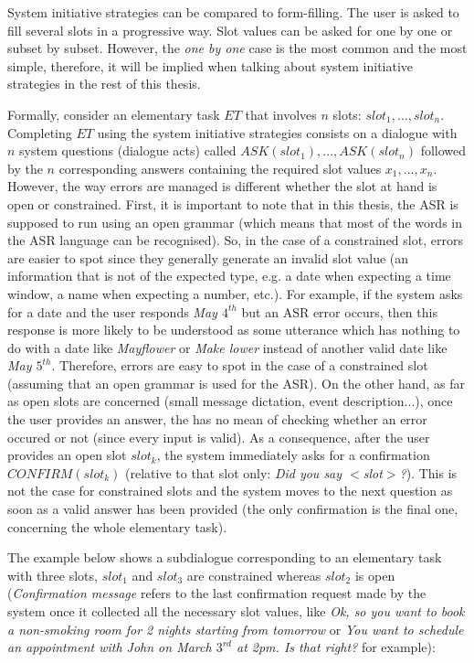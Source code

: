 		System initiative strategies can be compared to form-filling. The user is asked to fill several slots in a progressive way. Slot values can be asked for one by one or subset by subset. However, the \textit{one by one} case is the most common and the most simple, therefore, it will be implied when talking about system initiative strategies in the rest of this thesis.
		
		Formally, consider an elementary task $ET$ that involves $n$ slots: $slot_1, ..., slot_n$. Completing $ET$ using the system initiative strategies consists on a dialogue with $n$ system questions (dialogue acts) called $ASK(slot_1),...,ASK(slot_n)$ followed by the $n$ corresponding answers containing the required slot values $x_1,...,x_n$. However, the way errors are managed is different whether the slot at hand is open or constrained. First, it is important to note that in this thesis, the ASR is supposed to run using an open grammar (which means that most of the words in the ASR language can be recognised). So, in the case of a constrained slot, errors are easier to spot since they generally generate an invalid slot value (an information that is not of the expected type, e.g. a date when expecting a time window, a name when expecting a number, etc.). For example, if the system asks for a date and the user responds \textit{May $4^{th}$} but an ASR error occurs, then this response is more likely to be understood as some utterance which has nothing to do with a date like \textit{Mayflower} or \textit{Make lower} instead of another valid date like \textit{May $5^{th}$}. Therefore, errors are easy to spot in the case of a constrained slot (assuming that an open grammar is used for the ASR). On the other hand, as far as open slots are concerned (small message dictation, event description...), once the user provides an answer, the has no mean of checking whether an error occured or not (since every input is valid). As a consequence, after the user provides an open slot $slot_k$, the system immediately asks for a confirmation $CONFIRM(slot_k)$ (relative to that slot only: \textit{Did you say $<$slot$>$?}). This is not the case for constrained slots and the system moves to the next question as soon as a valid answer has been provided (the only confirmation is the final one, concerning the whole elementary task).

                The example below shows a subdialogue corresponding to an elementary task with three slots, $slot_1$ and $slot_3$ are constrained whereas $slot_2$ is open (\textit{Confirmation message} refers to the last confirmation request made by the system once it collected all the necessary slot values, like \textit{Ok, so you want to book a non-smoking room for 2 nights starting from tomorrow} or \textit{You want to schedule an appointment with John on March $3^{rd}$ at 2pm. Is that right?} for example):
		

